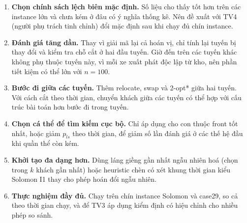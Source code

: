 \begin{enumerate}
  \item \textbf{Chọn chính sách lệch biên mặc định.} Số liệu cho thấy  tốt hơn
         trên các instance lớn và chưa kém ở đâu có ý nghĩa thống kê. Nên đề xuất với TV4 (người
        phụ trách tinh chỉnh) đổi mặc định sau khi chạy đủ chín instance.
  \item \textbf{Đánh giá tăng dần.} Thay vì giải mã lại cả hoán vị, chỉ tính lại tuyến bị thay đổi và kiểm
        tra chỗ cắt ở hai đầu tuyến. Giờ đến trên các tuyến khác không phụ thuộc tuyến này, vì mỗi xe xuất
        phát độc lập từ kho, nên phần tiết kiệm có thể lớn với $n = 100$.
  \item \textbf{Bước đi giữa các tuyến.} Thêm relocate, swap và 2-opt* giữa hai tuyến. Với cách cắt theo
        thời gian, chuyển khách giữa các tuyến có thể hợp với cấu trúc bài toán hơn bước đi trong tuyến.
  \item \textbf{Chọn cá thể để tìm kiếm cục bộ.} Chỉ áp dụng cho con thuộc front tốt nhất, hoặc giảm $p_{ls}$
        theo thời gian, để giảm số lần đánh giá ở các thế hệ đầu khi quần thể còn kém.
  \item \textbf{Khởi tạo đa dạng hơn.} Dùng láng giềng gần nhất ngẫu nhiên hoá (chọn trong $k$ khách gần
        nhất) hoặc heuristic chèn có xét khung thời gian kiểu Solomon I1 thay cho phép hoán đổi ngẫu nhiên.
  \item \textbf{Thực nghiệm đầy đủ.} Chạy trên chín instance Solomon và case29, so cả theo thời gian chạy,
        và để TV3 áp dụng kiểm định có hiệu chỉnh cho nhiều phép so sánh.
\end{enumerate}
